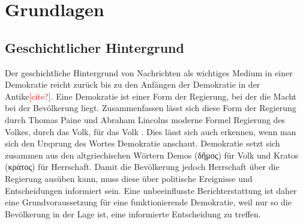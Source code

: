 \section{Grundlagen}

\subsection{Geschichtlicher Hintergrund}
Der geschichtliche Hintergrund von Nachrichten als wichtiges Medium in einer Demokratie reicht zurück bis zu den Anfängen der Demokratie in der Antike\textcolor{red}{[cite?]}.
Eine Demokratie ist einer Form der Regierung, bei der die Macht bei der Bevölkerung liegt.
Zusammenfassen lässt sich diese Form der Regierung durch Thomas Paine und Abraham Lincolns moderne Formel \glqq Regierung des Volkes, durch das Volk, für das Volk\grqq{} \cite{lincoln}.
Dies lässt sich auch erkennen, wenn man sich den Ursprung des Wortes Demokratie anschaut.
Demokratie setzt sich zusammen aus den altgriechischen Wörtern Demos (\textgreek{δῆμος}) für Volk und Kratos (\textgreek{κράτος}) für Herrschaft.
Damit die Bevölkerung jedoch Herrschaft über die Regierung ausüben kann, muss diese über politische Ereignisse und Entscheidungen informiert sein.
Eine unbeeinflusste Berichterstattung ist daher eine Grundvoraussetzung für eine funktionierende Demokratie, weil nur so die Bevölkerung in der Lage ist, eine informierte Entscheidung zu treffen.




